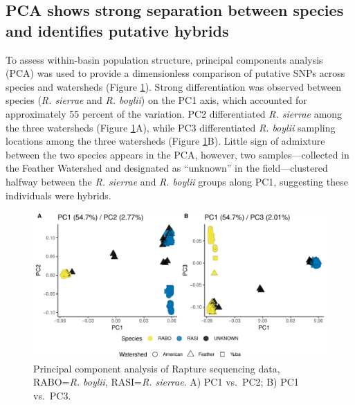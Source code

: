 \documentclass[proquest,12pt,final]{ucthesis-CA2012} %
\begin{document}
\begin{ucmainmatter}
\hypertarget{pca-shows-strong-separation-between-species-and-identifies-putative-hybrids}{%
\subsection{PCA shows strong separation between species and identifies
putative
hybrids}\label{pca-shows-strong-separation-between-species-and-identifies-putative-hybrids}}

To assess within-basin population structure, principal components
analysis (PCA) was used to provide a dimensionless comparison of
putative SNPs across species and watersheds (Figure \ref{fig:CH2F2pca}).
Strong differentiation was observed between species (\emph{R. sierrae}
and \emph{R. boylii}) on the PC1 axis, which accounted for approximately
55 percent of the variation. PC2 differentiated \emph{R. sierrae} among
the three watersheds (Figure \ref{fig:CH2F2pca}A), while PC3
differentiated \emph{R. boylii} sampling locations among the three
watersheds (Figure \ref{fig:CH2F2pca}B). Little sign of admixture
between the two species appears in the PCA, however, two
samples---collected in the Feather Watershed and designated as
``unknown'' in the field---clustered halfway between the \emph{R.
sierrae} and \emph{R. boylii} groups along PC1, suggesting these
individuals were hybrids.




\begin{figure}

{\centering \includegraphics[width=0.95\linewidth]{figure/ch2/figure_02_pca_rasi_all_25k_combined} 

}

\caption{Principal component analysis of Rapture sequencing data,
RABO=\emph{R. boylii}, RASI=\emph{R. sierrae}. A) PC1 vs.~PC2; B) PC1
vs.~PC3.}\label{fig:CH2F2pca}
\end{figure}
\clearpage


\end{ucmainmatter}
\end{document}
